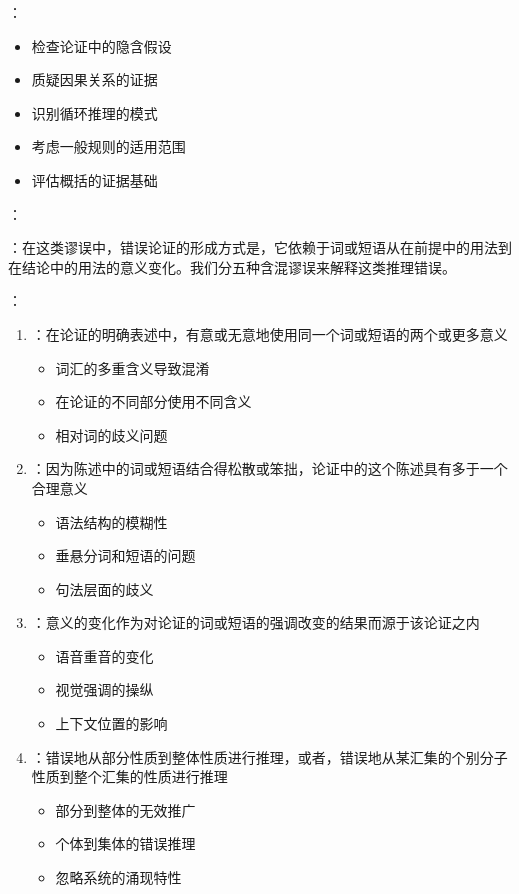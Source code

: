 \begin{theorembox}[title=预设谬误的特征与类型]
：
\begin{itemize}
  \item 检查论证中的隐含假设
  \item 质疑因果关系的证据
  \item 识别循环推理的模式
  \item 考虑一般规则的适用范围
  \item 评估概括的证据基础
\end{itemize}
\end{theorembox}

：
\begin{theorembox}[title=含混谬误的特征与类型]
：在这类谬误中，错误论证的形成方式是，它依赖于词或短语从在前提中的用法到在结论中的用法的意义变化。我们分五种含混谬误来解释这类推理错误。

：
\begin{enumerate}
  \item {}：在论证的明确表述中，有意或无意地使用同一个词或短语的两个或更多意义
  \begin{itemize}
    \item 词汇的多重含义导致混淆
    \item 在论证的不同部分使用不同含义
    \item 相对词的歧义问题
  \end{itemize}

  \item {}：因为陈述中的词或短语结合得松散或笨拙，论证中的这个陈述具有多于一个合理意义
  \begin{itemize}
    \item 语法结构的模糊性
    \item 垂悬分词和短语的问题
    \item 句法层面的歧义
  \end{itemize}

  \item {}：意义的变化作为对论证的词或短语的强调改变的结果而源于该论证之内
  \begin{itemize}
    \item 语音重音的变化
    \item 视觉强调的操纵
    \item 上下文位置的影响
  \end{itemize}

  \item {}：错误地从部分性质到整体性质进行推理，或者，错误地从某汇集的个别分子性质到整个汇集的性质进行推理
  \begin{itemize}
    \item 部分到整体的无效推广
    \item 个体到集体的错误推理
    \item 忽略系统的涌现特性
  \end{itemize}


\end{enumerate}
\end{theorembox}
